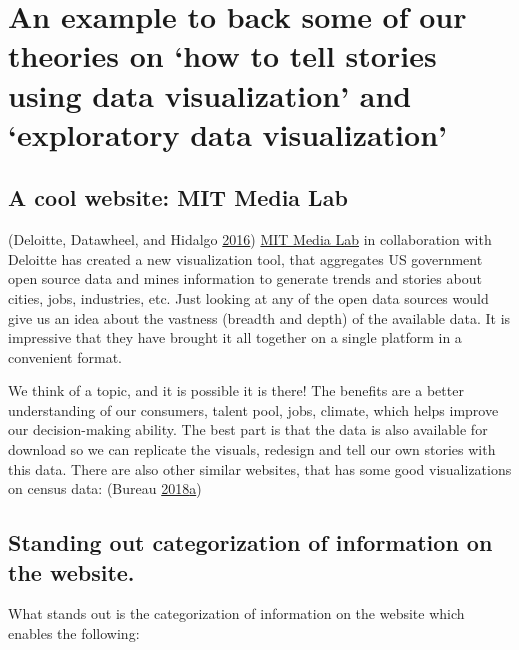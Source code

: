 \documentclass[]{book}
\begin{document}
\section{\texorpdfstring{An example to back some of our theories on `how
to tell stories using data visualization' and `exploratory data
visualization'}{An example to back some of our theories on how to tell stories using data visualization and exploratory data visualization}}\label{an-example-to-back-some-of-our-theories-on-how-to-tell-stories-using-data-visualization-and-exploratory-data-visualization}

\subsection{A cool website: MIT Media
Lab}\label{a-cool-website-mit-media-lab}

(Deloitte, Datawheel, and Hidalgo \protect\hyperlink{ref-DataUSA}{2016})
\href{https://www.media.mit.edu}{MIT Media Lab} in collaboration with
Deloitte has created a new visualization tool, that aggregates US
government open source data and mines information to generate trends and
stories about cities, jobs, industries, etc. Just looking at any of the
open data sources would give us an idea about the vastness (breadth and
depth) of the available data. It is impressive that they have brought it
all together on a single platform in a convenient format.

We think of a topic, and it is possible it is there! The benefits are a
better understanding of our consumers, talent pool, jobs, climate, which
helps improve our decision-making ability. The best part is that the
data is also available for download so we can replicate the visuals,
redesign and tell our own stories with this data. There are also other
similar websites, that has some good visualizations on census data:
(Bureau
\protect\hyperlink{ref-CensusDataViz}{2018}\protect\hyperlink{ref-CensusDataViz}{a})

\subsection{Standing out categorization of information on the
website.}\label{standing-out-categorization-of-information-on-the-website.}

What stands out is the categorization of information on the website
which enables the following:
\end{document}
